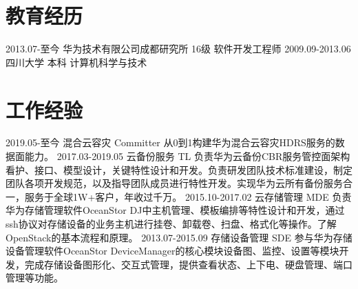 \documentclass[]{resume}
\begin{document}





\makeprofile


\section{教育经历}
\begin{twenty}
  \twentyitem
    {2013.07-至今}
    {华为技术有限公司成都研究所}
    {16级}
    {软件开发工程师}
  \twentyitem
    {2009.09-2013.06}
    {四川大学}
    {本科}
    {计算机科学与技术}
\end{twenty}


\section{工作经验}

\begin{twenty}
  \twentyitem
    {2019.05-至今}
    {混合云容灾}
    {Committer}
    {从0到1构建华为混合云容灾HDRS服务的数据面能力。}
  \twentyitem
    {2017.03-2019.05}
    {云备份服务}
    {TL}
    {负责华为云备份CBR服务管控面架构看护、接口、模型设计，关键特性设计和开发。负责研发团队技术标准建设，制定团队各项开发规范，以及指导团队成员进行特性开发。实现华为云所有备份服务合一，服务于全球1W+客户，年收过千万。}
\twentyitem
    {2015.10-2017.02}
    {云存储管理}
    {MDE}
    {负责华为存储管理软件OceanStor DJ中主机管理、模板编排等特性设计和开发，通过ssh协议对存储设备的业务主机进行挂卷、卸载卷、扫盘、格式化等操作。了解OpenStack的基本流程和原理。}
\twentyitem
    {2013.07-2015.09}
    {存储设备管理}
    {SDE}
    {参与华为存储设备管理软件OceanStor DeviceManager的核心模块设备图、监控、设置等模块开发，完成存储设备图形化、交互式管理，提供查看状态、上下电、硬盘管理、端口管理等功能。}
\end{twenty}
\end{document}
